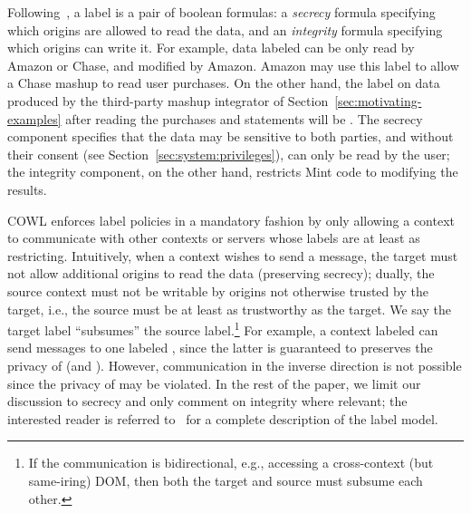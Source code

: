 Following~\cite{yang:2013:towards, stefan:2011:dclabels}, a label is a
pair of boolean formulas: a \emph{secrecy} formula specifying which
origins are allowed to read the data, and an \emph{integrity} formula
specifying which origins can write it.
%
For example, data labeled 
can be only read by Amazon or Chase, and modified by Amazon.
%
Amazon may use this label to allow a Chase mashup to read
user purchases.
%
On the other hand, the label on data produced by the third-party
mashup integrator of Section~\ref{sec:motivating-examples} after
reading the purchases and statements will be
.
%
The secrecy component specifies that the data may be sensitive to both
parties, and without their consent (see
Section~\ref{sec:system:privileges}), can only be read by the user;
the integrity component, on the other hand, restricts Mint code to
modifying the results.
 
COWL enforces label policies in a mandatory fashion by only allowing a
context to communicate with other contexts or servers whose labels are
at least as restricting.
%
Intuitively, when a context wishes to send a message, the target must
not allow additional origins to read the data (preserving secrecy);
dually, the source context must not be writable by origins not
otherwise trusted by the target, i.e., the source must be at least as
trustworthy as the target.
%
We say the target label ``subsumes'' the source label.\footnote{
  If the communication is bidirectional, e.g., accessing a
cross-context (but same-iring) DOM, then both the target and source
must subsume each other.}
%
For example, a context labeled
 can send messages to
one labeled , since the latter is guaranteed
to preserves the privacy of  (and
).
%
However, communication in the inverse direction is not possible since
the privacy of  may be violated.
%
In the rest of the paper, we limit our discussion to secrecy and only
comment on integrity where relevant; the interested reader is referred
to~\cite{stefan:2011:dclabels} for a complete description of the label
model.

